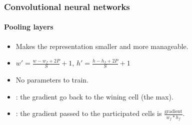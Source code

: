 \documentclass[xcolor=table]{beamer}
\begin{document}
\begin{frame}
	\frametitle{\insertshortsubtitle}
	\framesubtitle{\insertsection}
	
\end{frame}

\begin{frame}
\frametitle{Convolutional neural networks}
\framesubtitle{Pooling layers}

\begin{minipage}{0.60\textwidth} 
	\begin{itemize}
		\item Makes the representation smaller and more manageable.
		\item $ w' = \frac{w - w_f + 2P}{S} + 1$,  $ h' = \frac{h - h_f + 2P}{S} + 1$
		\item No parameters to train.
		\item {}: the gradient go back to the wining cell (the max).
		\item {}: the gradient passed to the participated cells is $\frac{\text{gradient}}{w_f * h_f}$. 
	\end{itemize}
\end{minipage}
%
\begin{minipage}{0.39\textwidth}
	
\end{minipage}

\end{frame}
\end{document}

